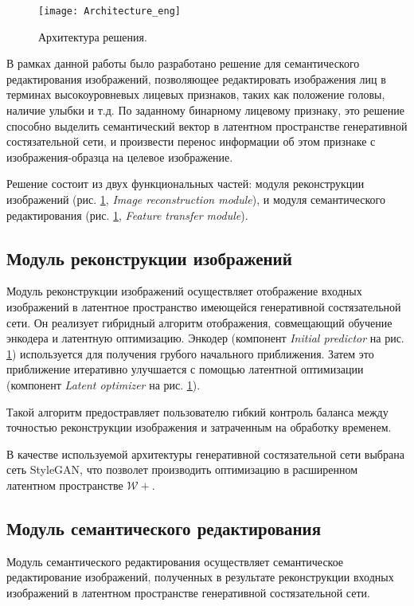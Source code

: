 
\begin{figure}[h]
\begin{center}
    \texttt{[image: Architecture\_eng]}
    \caption{Архитектура решения.}
    \label{fig:architecture}
\end{center}
\end{figure}


В рамках данной работы было разработано решение для семантического редактирования изображений, позволяющее редактировать изображения лиц в терминах высокоуровневых лицевых признаков, таких как положение головы, наличие улыбки и т.д.
По заданному бинарному лицевому признаку, это решение способно выделить семантический вектор в латентном пространстве генеративной состязательной сети, и произвести перенос информации об этом признаке с изображения-образца на целевое изображение.

Решение состоит из двух функциональных частей: модуля реконструкции изображений (рис. \ref{fig:architecture}, \emph{Image reconstruction module}), и модуля семантического редактирования (рис. \ref{fig:architecture}, \emph{Feature transfer module}).

\subsection{Модуль реконструкции изображений}
Модуль реконструкции изображений осуществляет отображение входных изображений в латентное пространство имеющейся генеративной состязательной сети.
Он реализует гибридный алгоритм отображения, совмещающий обучение энкодера и латентную оптимизацию. 
Энкодер (компонент \emph{Initial predictor} на рис. \ref{fig:architecture}) используется для получения грубого начального приближения.
Затем это приближение итеративно улучшается с помощью латентной оптимизации (компонент \emph{Latent optimizer} на рис. \ref{fig:architecture}).

Такой алгоритм предостравляет пользователю гибкий контроль баланса между точностью реконструкции изображения и затраченным на обработку временем.

В качестве используемой архитектуры генеративной состязательной сети выбрана сеть StyleGAN, что позволет производить оптимизацию в расширенном латентном пространстве $\mathcal W+$.

\subsection{Модуль семантического редактирования}
Модуль семантического редактирования осуществляет семантическое редактирование изображений, полученных в результате реконструкции входных изображений в латентном пространстве генеративной состязательной сети. 

